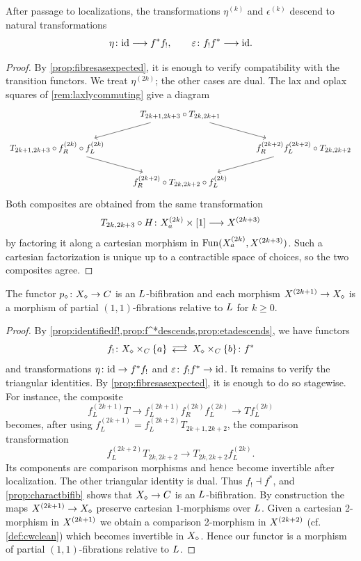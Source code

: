 \documentclass[a4paper,reqno,twoside]{amsart}
\begin{document}
\begin{proposition}\label{prop:etadescends}
	After passage to localizations, the transformations $\eta^{(k)}$ and $\epsilon^{(k)}$ descend to natural transformations
	\[
		\eta\colon\mathrm{id}\longrightarrow f^*f_!,
		\qquad
		\varepsilon\colon f_!f^*\longrightarrow\mathrm{id}.
	\]
\end{proposition}
\begin{proof}
	By \cref{prop:fibresasexpected}, it is enough to verify compatibility with the transition functors. We treat $\eta^{(2k)}$; the other cases are dual. The lax and oplax squares of \cref{rem:laxlycommuting} give a diagram
	\[\begin{tikzcd}
	& {T_{2k+1,2k+3}\circ T_{2k,2k+1}} & \\
	{T_{2k+1,2k+3}\circ f_{R}^{(2k)}\circ f_L^{(2k)}} && {f_R^{(2k+2)}f_{L}^{(2k+2)}\circ T_{2k,2k+2}} \\
	& {f_R^{(2k+2)}\circ T_{2k,2k+2}\circ f_L^{(2k)}}
	\arrow[from=1-2, to=2-1]
	\arrow[from=1-2, to=2-3]
	\arrow[from=2-1, to=3-2]
	\arrow[from=2-3, to=3-2]
\end{tikzcd}\]
	Both composites are obtained from the same transformation
	\[
		T_{2k,2k+3}\circ H\colon
		\relax{X}_a^{(2k)}\times[1]\longrightarrow\relax{X}^{(2k+3)}
	\]
	by factoring it along a cartesian morphism in
	$\mathrm{Fun}(\relax{X}_a^{(2k)},\relax{X}^{(2k+3)})$. Such a cartesian factorization is unique up to a contractible space of choices, so the two composites agree. 
\end{proof}

\begin{proposition}\label{prop:isbifib}
	The functor $p_\diamond \colon \relax{X}_\diamond \to \relax{C}$ is an $\relax{L}$-bifibration and each morphism $\relax{X}^{(2k+1)} \to \relax{X}_{\diamond}$ is a morphism of partial $(1,1)$-fibrations relative to $\relax{L}$ for $k\geq 0$.
\end{proposition}
\begin{proof}
	 By \cref{prop:identifiedf!,prop:f^*descends,prop:etadescends}, we have functors
	\[
		f_!\colon \cX_{\diamond}\times_{\cC} \{a\} \llra
		\cX_{\diamond}\times_{\cC} \{b\}\colon f^*
	\]
	and transformations $\eta\colon\mathrm{id}\to f^*f_!$ and $\varepsilon\colon f_!f^*\to\mathrm{id}$. It remains to verify the triangular identities. By \cref{prop:fibresasexpected}, it is enough to do so stagewise. For instance, the composite
	\[
		f_L^{(2k+1)}T
		\longrightarrow
		f_L^{(2k+1)}f_R^{(2k)}f_L^{(2k)}
		\longrightarrow
		Tf_L^{(2k)}
	\]
	becomes, after using $f_L^{(2k+1)}=f_L^{(2k+2)}T_{2k+1,2k+2}$, the comparison transformation
	\[
		f_L^{(2k+2)}T_{2k,2k+2}
		\longrightarrow
		T_{2k,2k+2}f_L^{(2k)}.
	\]
	Its components are comparison morphisms and hence become invertible after localization. The other triangular identity is dual. Thus $f_!\dashv f^*$, and \cref{prop:charactbifib} shows that $\relax{X}_\diamond\to\relax{C}$ is an $\relax{L}$-bifibration. By construction the maps $\relax{X}^{(2k+1)} \to \relax{X}_{\diamond}$ preserve cartesian $1$-morphisms over $\relax{L}$. Given a cartesian 2-morphism in $\relax{X}^{(2k+1)}$ we obtain a comparison 2-morphism in $\relax{X}^{(2k+2)}$ (cf. \cref{def:cwclean}) which becomes invertible in $\relax{X}_{\diamond}$. Hence our functor is a morphism of partial $(1,1)$-fibrations relative to $\relax{L}$.
\end{proof}
\end{document}
